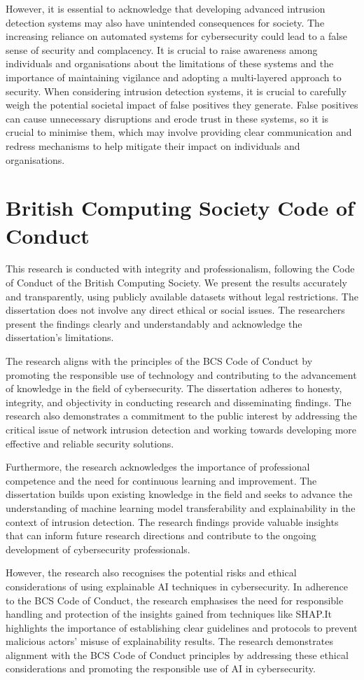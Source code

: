 However, it is essential to acknowledge that developing advanced intrusion detection systems may also have unintended consequences for society. The increasing reliance on automated systems for cybersecurity could lead to a false sense of security and complacency. It is crucial to raise awareness among individuals and organisations about the limitations of these systems and the importance of maintaining vigilance and adopting a multi-layered approach to security. When considering intrusion detection systems, it is crucial to carefully weigh the potential societal impact of false positives they generate. False positives can cause unnecessary disruptions and erode trust in these systems, so it is crucial to minimise them, which may involve providing clear communication and redress mechanisms to help mitigate their impact on individuals and organisations.

\section{British Computing Society Code of Conduct}
This research is conducted with integrity and professionalism, following the Code of Conduct of the British Computing Society. We present the results accurately and transparently, using publicly available datasets without legal restrictions. The dissertation does not involve any direct ethical or social issues. The researchers present the findings clearly and understandably and acknowledge the dissertation's limitations.

The research aligns with the principles of the BCS Code of Conduct by promoting the responsible use of technology and contributing to the advancement of knowledge in the field of cybersecurity. The dissertation adheres to honesty, integrity, and objectivity in conducting research and disseminating findings. The research also demonstrates a commitment to the public interest by addressing the critical issue of network intrusion detection and working towards developing more effective and reliable security solutions.

Furthermore, the research acknowledges the importance of professional competence and the need for continuous learning and improvement. The dissertation builds upon existing knowledge in the field and seeks to advance the understanding of machine learning model transferability and explainability in the context of intrusion detection. The research findings provide valuable insights that can inform future research directions and contribute to the ongoing development of cybersecurity professionals.

However, the research also recognises the potential risks and ethical considerations of using explainable AI techniques in cybersecurity. In adherence to the BCS Code of Conduct, the research emphasises the need for responsible handling and protection of the insights gained from techniques like SHAP.\@ It highlights the importance of establishing clear guidelines and protocols to prevent malicious actors' misuse of explainability results. The research demonstrates alignment with the BCS Code of Conduct principles by addressing these ethical considerations and promoting the responsible use of AI in cybersecurity.
